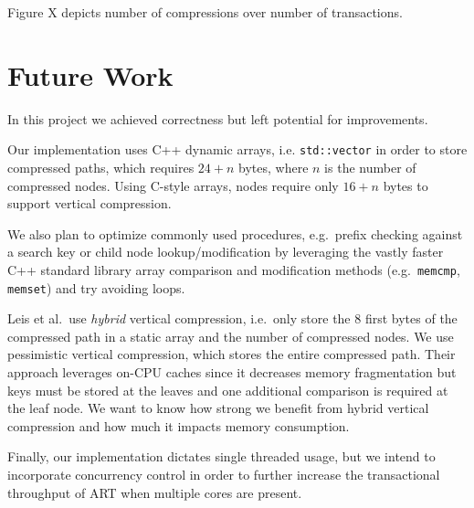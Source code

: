 \documentclass[abstracton,12pt]{scrartcl}
\theoremstyle{definition}
\begin{document}
Figure X depicts number of compressions over number of transactions.

\section{Future Work}
\label{sec:future-work}

In this project we achieved correctness but left potential for improvements.

Our implementation uses C++ dynamic arrays, i.e. \texttt{std::vector} in order
to store compressed paths, which requires $24 + n$ bytes, where $n$ is the
number of compressed nodes. Using C-style arrays, nodes require only $16 + n$
bytes to support vertical compression.

We also plan to optimize commonly used procedures, e.g.\ prefix checking
against a search key or child node lookup/modification by leveraging the vastly
faster C++ standard library array comparison and modification methods
(e.g.\ \texttt{memcmp}, \texttt{memset}) and try avoiding loops.

Leis et al.\ use \textit{hybrid} vertical compression, i.e.\ only store the
8 first bytes of the compressed path in a static array and the number of
compressed nodes. We use pessimistic vertical compression, which stores
the entire compressed path.
Their approach leverages on-CPU caches since it decreases memory fragmentation
but keys must be stored at the leaves and one additional comparison is
required at the leaf node. We want to know how strong we benefit from hybrid 
vertical compression and how much it impacts memory consumption.

Finally, our implementation dictates single threaded usage, but we intend to
incorporate concurrency control in order to further increase the transactional
throughput of ART when multiple cores are present.

\newpage



\end{document}
